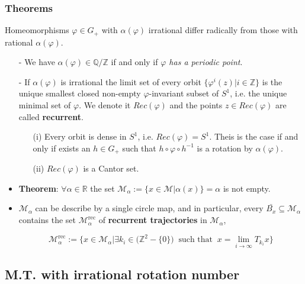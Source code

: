\documentclass[12 pt]{beamer}
\begin{document}
\begin{frame}
	\frametitle{Theorems}
	
	Homeomorphisms $\varphi \in G_{+}$ with $\alpha ( \varphi )$ irrational differ radically from those with rational $\alpha ( \varphi )$.
	\begin{itemize}
		\item[-] We have $\alpha ( \varphi ) \in \mathbb{Q} / \mathbb{Z}$ if and only if \textit{$\varphi$ has a periodic point}.
	\item[-] If $\alpha ( \varphi )$ is irrational the limit set of every orbit $ \{ \varphi^{i} (z) | i \in \mathbb{Z} \}$ is the unique smallest closed non-empty $\varphi$-invariant subset of $S^{1}$, i.e. the unique minimal set of $\varphi$. We denote it $Rec(\varphi)$ and the points $z \in Rec(\varphi)$ are called \textbf{recurrent}.
	\begin{itemize}
		\item[(i)] Every orbit is dense in $S^{1}$, i.e. $Rec(\varphi) = S^1$. Theis is the case if and only if exists an $h \in G_{+}$ such that $h \circ \varphi \circ h^{-1}$ is a rotation by $\alpha ( \varphi)$.
		\item[(ii)] $Rec(\varphi)$ is a Cantor set.
		\end{itemize}
	\end{itemize}
	
\end{frame}

\begin{frame}
	\begin{itemize}
		\item \textbf{Theorem}: $\forall \alpha \in \mathbb{R}$ the set $\mathcal{M}_{\alpha} := \{ x \in \mathcal{M} | \alpha(x) \} = \alpha$ is not empty.
		\item $\mathcal{M}_{\alpha}$ can be describe by a single circle map, and in particular, every $\bar{B_{x}} \subseteq \mathcal{M}_{\alpha}$ contains the set $\mathcal{M}_{\alpha}^{\text{rec}}$ of \textbf{recurrent trajectories} in $\mathcal{M}_{\alpha}$, 

	$$
		\mathcal{M}_{\alpha}^{\text{rec}} := \{ x \in \mathcal{M}_{\alpha} | \exists k_i \in \big( \mathbb{Z}^{2} - \{ 0 \}       \big) \ \text{ such that } \ x = \lim_{i \rightarrow \infty } T_{k_i} x \}
	$$
\end{itemize}		
	
	
\end{frame}

\subsection{M.T. with irrational rotation number}
\end{document}
